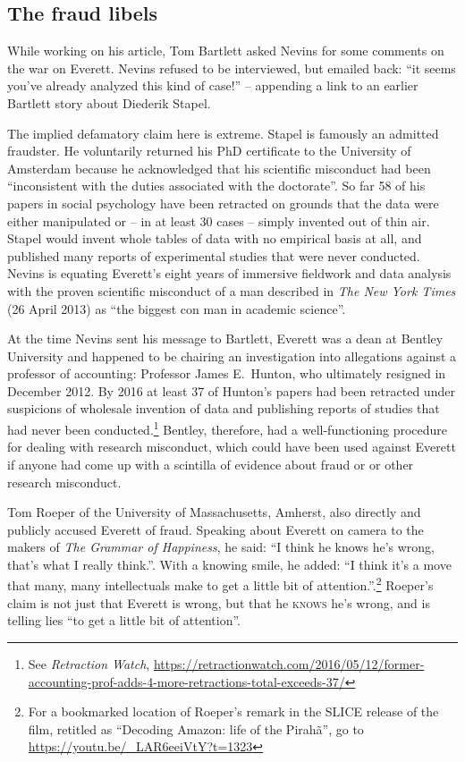 \documentclass[output=paper,colorlinks,citecolor=brown
]{langscibook}
\begin{document}
\subsection{The fraud libels}

While working on his \citeyear{Bartlett12} article, Tom Bartlett asked
Nevins for some comments on the war on Everett. Nevins refused to be
interviewed, but emailed back: ``it seems you've already analyzed this
kind of case!'' -- appending a link to an earlier Bartlett story about
Diederik Stapel.

The implied defamatory claim here is extreme. Stapel is famously an
admitted fraudster. He voluntarily returned his PhD certificate to
the University of Amsterdam because he acknowledged that his scientific
misconduct had been ``inconsistent with the duties associated with the
doctorate''. So far 58 of his papers in social psychology have been
retracted on grounds that the data were either manipulated or -- in
at least 30 cases -- simply invented out of thin air. Stapel would
invent whole tables of data with no empirical basis at all, and
published many reports of experimental studies that were never
conducted. Nevins is equating Everett's eight years of immersive
fieldwork and data analysis with the proven scientific misconduct of
a man described in \textit{The New York Times} (26 April 2013) as
``the biggest con man in academic science''.

At the time Nevins sent his message to Bartlett, Everett was a dean
at Bentley University and happened to be chairing an investigation
into allegations against a professor of accounting: Professor James
E.\ Hunton, who ultimately resigned in December 2012. By 2016 at
least 37 of Hunton's papers had been retracted under suspicions of
wholesale invention of data and publishing reports of studies that
had never been conducted.\footnote{\label{retraction}
   See \textit{Retraction Watch},
   \url{https://retractionwatch.com/2016/05/12/former-accounting-prof-adds-4-more-retractions-total-exceeds-37/}}
Bentley, therefore, had a well-functioning procedure for dealing with
research misconduct, which could have been used against Everett if
anyone had come up with a scintilla of evidence about fraud or or other
research misconduct.

Tom Roeper of the University of Massachusetts, Amherst, also directly
and publicly accused Everett of fraud. Speaking about Everett on camera
to the makers of \textit{The Grammar of Happiness}, he said: ``I think he
knows he's wrong, that's what I really think.''. With a knowing smile, he
added: ``I think it's a move that many, many intellectuals make to get a
little bit of attention.''.\footnote{\label{roeper}
   For a bookmarked location of Roeper's remark in the SLICE release
   of the film, retitled as ``Decoding Amazon: life of the Pirah{\~a}'',
   go to \url{https://youtu.be/_LAR6eeiVtY?t=1323}}
Roeper's claim is not just that Everett is wrong, but that he
\textsc{knows} he's wrong, and is telling lies ``to get a little bit
of attention''.
\end{document}
